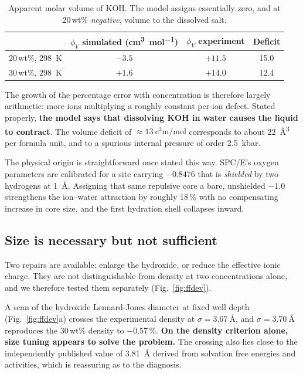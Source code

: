 \documentclass[11pt,a4paper]{article}
\begin{document}
\begin{table}[htbp]\centering\small
\caption{Apparent molar volume of KOH. The model assigns essentially zero, and at 20\,wt\%
\emph{negative}, volume to the dissolved salt.}
\label{tab:phiv}
\begin{tabular}{@{}lccc@{}}
\toprule
& $\phi_V$ simulated (\si{\cubic\centi\metre\per\mole}) & $\phi_V$ experiment & Deficit \\
\midrule
20\,wt\%, \SI{298}{\kelvin} & $-3.5$ & $+11.5$ & 15.0 \\
30\,wt\%, \SI{298}{\kelvin} & $+1.6$ & $+14.0$ & 12.4 \\
\bottomrule
\end{tabular}
\end{table}

The growth of the percentage error with concentration is therefore largely arithmetic: more ions
multiplying a roughly constant per-ion defect. Stated properly, \textbf{the model says that
dissolving KOH in water causes the liquid to contract}. The volume deficit of
$\approx\SI{13}{\cubic\centi\metre\per\mole}$ corresponds to about \SI{22}{\cubic\angstrom} per
formula unit, and to a spurious internal pressure of order \SI{2.5}{\kilo\bar}.

The physical origin is straightforward once stated this way. SPC/E's oxygen parameters are calibrated
for a site carrying $-0.8476$ that is \emph{shielded} by two hydrogens at \SI{1}{\angstrom}. Assigning
that same repulsive core a bare, unshielded $-1.0$ strengthens the ion--water attraction by roughly
18\,\% with no compensating increase in core size, and the first hydration shell collapses inward.

\subsection{Size is necessary but not sufficient}

Two repairs are available: enlarge the hydroxide, or reduce the effective ionic charge. They are not
distinguishable from density at two concentrations alone, and we therefore tested them separately
(Fig.~\ref{fig:ffdev}).

A scan of the hydroxide Lennard-Jones diameter at fixed well depth (Fig.~\ref{fig:ffdev}a) crosses the
experimental density at $\sigma = \SI{3.67}{\angstrom}$, and $\sigma = \SI{3.70}{\angstrom}$
reproduces the 30\,wt\% density to $-0.57\,\%$. \textbf{On the density criterion alone, size tuning
appears to solve the problem.} The crossing also lies close to the independently published value of
\SI{3.81}{\angstrom} derived from solvation free energies and activities, which is reassuring as to
the diagnosis.
\end{document}
